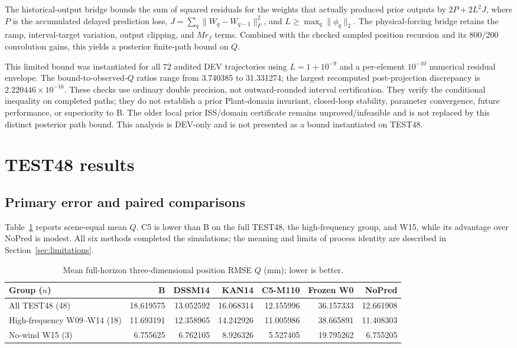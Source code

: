 \documentclass[11pt]{article}
\begin{document}
The historical-output bridge bounds the sum of squared residuals for the weights that actually produced prior outputs by $2P+2L^2J$, where $P$ is the accumulated delayed prediction loss, $J=\sum_q\|W_q-W_{q-1}\|_F^2$, and $L\geq\max_q\|\phi_q\|_2$. The physical-forcing bridge retains the ramp, interval-target variation, output clipping, and $Mr_f$ terms. Combined with the checked sampled position recursion and its 800/200 convolution gains, this yields a posterior finite-path bound on $Q$.

This limited bound was instantiated for all 72 audited DEV trajectories using $L=1+10^{-9}$ and a per-element $10^{-10}$ numerical residual envelope. The bound-to-observed-$Q$ ratios range from 3.740385 to 31.331274; the largest recomputed post-projection discrepancy is $2.220446\times10^{-16}$. These checks use ordinary double precision, not outward-rounded interval certification. They verify the conditional inequality on completed paths; they do not establish a prior Plant-domain invariant, closed-loop stability, parameter convergence, future performance, or superiority to B. The older local prior ISS/domain certificate remains unproved/infeasible and is not replaced by this distinct posterior path bound. This analysis is DEV-only and is not presented as a bound instantiated on TEST48.

\section{TEST48 results}
\subsection{Primary error and paired comparisons}
Table~\ref{tab:groupmeans} reports scene-equal mean $Q$. C5 is lower than B on the full TEST48, the high-frequency group, and W15, while its advantage over NoPred is modest. All six methods completed the simulations; the meaning and limits of process identity are described in Section~\ref{sec:limitations}.

\begin{table}[t]
\centering
\small
\caption{Mean full-horizon three-dimensional position RMSE $Q$ (mm); lower is better.}
\label{tab:groupmeans}
\begin{tabular}{lrrrrrr}
\toprule
Group ($n$) & B & DSSM14 & KAN14 & C5-M110 & Frozen W0 & NoPred \\
\midrule
All TEST48 (48) & 18.619575 & 13.052592 & 16.068314 & 12.155996 & 36.157333 & 12.661908 \\
High-frequency W09--W14 (18) & 11.693191 & 12.358965 & 14.242926 & 11.005986 & 38.665891 & 11.408303 \\
No-wind W15 (3) & 6.755625 & 6.762105 & 8.926326 & 5.527405 & 19.795262 & 6.755205 \\
\bottomrule
\end{tabular}
\end{table}
\end{document}
